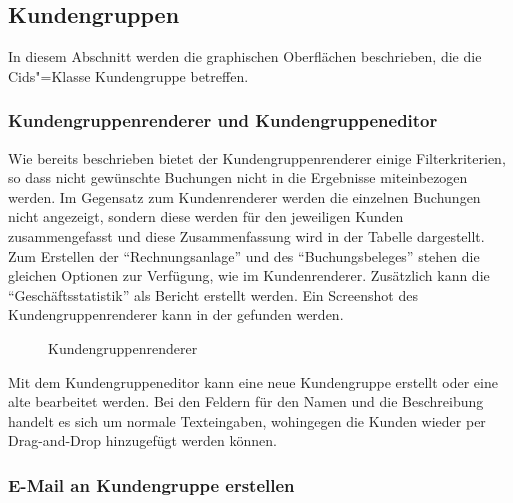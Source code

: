 
\subsection{Kundengruppen}
In diesem Abschnitt werden die graphischen Oberflächen beschrieben, die die Cids"=Klasse Kundengruppe betreffen.
\subsubsection{Kundengruppenrenderer und Kundengruppeneditor}
Wie bereits beschrieben bietet der Kundengruppenrenderer einige Filterkriterien, so dass nicht gewünschte Buchungen nicht in die Ergebnisse miteinbezogen werden.
Im Gegensatz zum Kundenrenderer werden die einzelnen Buchungen nicht angezeigt, sondern diese werden für den jeweiligen Kunden zusammengefasst und diese Zusammenfassung wird in der Tabelle dargestellt.
Zum Erstellen der \enquote{Rechnungsanlage} und des \enquote{Buchungsbeleges} stehen die gleichen Optionen zur Verfügung, wie im Kundenrenderer.
Zusätzlich kann die \enquote{Geschäftsstatistik} als Bericht erstellt werden.
Ein Screenshot des Kundengruppenrenderer kann in der  gefunden werden.
\begin{figure}[htb]
	\centering
	\caption{Kundengruppenrenderer}
	\label{fig:gui-kundengruppenrenderer}
\end{figure}

Mit dem Kundengruppeneditor kann eine neue Kundengruppe erstellt oder eine alte bearbeitet werden. Bei den Feldern für den Namen und die Beschreibung handelt es sich um normale Texteingaben, wohingegen die Kunden wieder per Drag-and-Drop hinzugefügt werden können.


\subsubsection{E-Mail an Kundengruppe erstellen}

